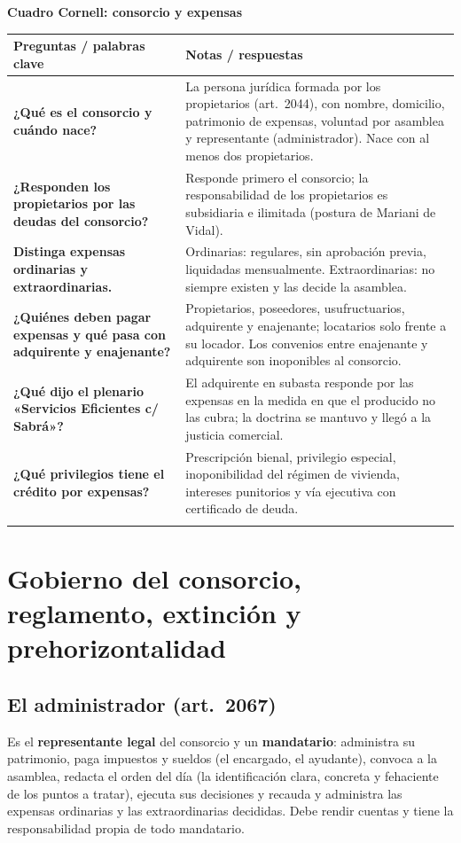 \documentclass[12pt,oneside]{book}
\renewcommand{\arraystretch}{1.25}
\newcommand{\cq}[2]{\textbf{#1} & #2 \\[0.45em]}
\newcommand{\cornell}[3]{%
\par\bigskip\noindent\textbf{\large Cuadro Cornell: #1}\par\smallskip
\begin{center}
\small
\renewcommand{\arraystretch}{1.15}
\begin{tabularx}{\textwidth}{>{\raggedright\arraybackslash}p{0.27\textwidth}>{\raggedright\arraybackslash}X}
\toprule
\textbf{Preguntas / palabras clave} & \textbf{Notas / respuestas} \\
\midrule
#2
\midrule
\multicolumn{2}{p{\dimexpr\textwidth-2\tabcolsep\relax}}{\textbf{Resumen.} #3} \\
\bottomrule
\end{tabularx}
\end{center}
}
\begin{document}
\cornell{consorcio y expensas}{
\cq{¿Qué es el consorcio y cuándo nace?}{La persona jurídica formada por los propietarios (art.~2044), con nombre, domicilio, patrimonio de expensas, voluntad por asamblea y representante (administrador). Nace con al menos dos propietarios.}
\cq{¿Responden los propietarios por las deudas del consorcio?}{Responde primero el consorcio; la responsabilidad de los propietarios es subsidiaria e ilimitada (postura de Mariani de Vidal).}
\cq{Distinga expensas ordinarias y extraordinarias.}{Ordinarias: regulares, sin aprobación previa, liquidadas mensualmente. Extraordinarias: no siempre existen y las decide la asamblea.}
\cq{¿Quiénes deben pagar expensas y qué pasa con adquirente y enajenante?}{Propietarios, poseedores, usufructuarios, adquirente y enajenante; locatarios solo frente a su locador. Los convenios entre enajenante y adquirente son inoponibles al consorcio.}
\cq{¿Qué dijo el plenario «Servicios Eficientes c/ Sabrá»?}{El adquirente en subasta responde por las expensas en la medida en que el producido no las cubra; la doctrina se mantuvo y llegó a la justicia comercial.}
\cq{¿Qué privilegios tiene el crédito por expensas?}{Prescripción bienal, privilegio especial, inoponibilidad del régimen de vivienda, intereses punitorios y vía ejecutiva con certificado de deuda.}
}{El consorcio es una persona jurídica sostenida por las expensas, cuya obligación recae sobre propietarios, poseedores y aun sobre quien ya enajenó. La expensa es una obligación \textit{propter rem sui generis} muy tutelada, y la doctrina del plenario protege el cobro frente a la subasta.}

\chapter[Gobierno del consorcio, reglamento, extinción y prehorizontalidad]{Gobierno del consorcio, reglamento, extinción y prehorizontalidad}\label{cap:gobierno-ph}

\section{El administrador (art.~2067)}

Es el \textbf{representante legal} del consorcio y un \textbf{mandatario}: administra su patrimonio, paga impuestos y sueldos (el encargado, el ayudante), convoca a la asamblea, redacta el orden del día (la identificación clara, concreta y fehaciente de los puntos a tratar), ejecuta sus decisiones y recauda y administra las expensas ordinarias y las extraordinarias decididas. Debe rendir cuentas y tiene la responsabilidad propia de todo mandatario.
\end{document}
